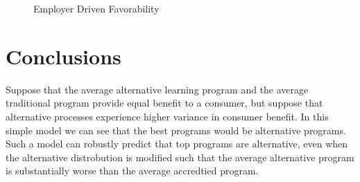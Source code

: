 \documentclass[AER]{./aea-latex-templates/AEA}
\begin{document}
        \begin{figure}[h!]
            \centering
            \caption{Employer Driven Favorability}
        
        
            \label{fig:employer_driven_favorability}
            \end{figure}

        \section{Conclusions}
        
        Suppose that the average alternative learning program and the average traditional program
        provide equal benefit to a consumer, but suppose that alternative
        processes experience higher variance in consumer benefit. In this
        simple model we can see that the best programs would be alternative
        programs. Such a model can robustly predict that top programs are
        alternative, even when the alternative distrobution is modified such
        that the average alternative program is substantially worse than the
        average accredtied program.
        
\end{document}
